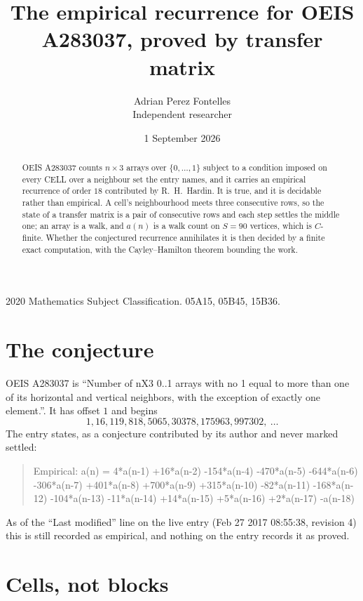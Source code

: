 \documentclass[11pt,a4paper]{article}
\title{The empirical recurrence for OEIS A283037, proved by transfer matrix}
\author{Adrian Perez Fontelles\\ \small Independent researcher}
\date{1 September 2026}
\theoremstyle{plain}
\theoremstyle{definition}
\begin{document}
\maketitle

\begin{abstract}
OEIS A283037 counts $n\times3$ arrays over $\{0,\dots,1\}$ subject to a condition imposed on
every CELL over a neighbour set the entry names, and it carries an empirical recurrence of
order $18$ contributed by R.~H.~Hardin. It is true, and it is decidable rather than
empirical. A cell's neighbourhood meets three consecutive rows, so the state of a transfer
matrix is a pair of consecutive rows and each step settles the middle one; an array is a
walk, and $a(n)$ is a walk count on $S=90$ vertices, which is $C$-finite. Whether the
conjectured recurrence annihilates it is then decided by a finite exact computation, with the
Cayley--Hamilton theorem bounding the work.
\end{abstract}

\noindent\small 2020 Mathematics Subject Classification. 05A15, 05B45, 15B36.\normalsize

\section{The conjecture}

OEIS A283037 is ``Number of nX3 0..1 arrays with no 1 equal to more than one of its horizontal and vertical neighbors, with the exception of exactly one element.''. It has offset $1$ and begins
\[
1, 16, 119, 818, 5065, 30378, 175963, 997302,\ \dots
\]
The entry states, as a conjecture contributed by its author and never marked settled:
\begin{quote}
Empirical: a(n) = 4*a(n-1) +16*a(n-2) -154*a(n-4) -470*a(n-5) -644*a(n-6) -306*a(n-7) +401*a(n-8) +700*a(n-9) +315*a(n-10) -82*a(n-11) -168*a(n-12) -104*a(n-13) -11*a(n-14) +14*a(n-15) +5*a(n-16) +2*a(n-17) -a(n-18)
\end{quote}
As of the ``Last modified'' line on the live entry (Feb 27 2017 08:55:38, revision 4) this is still
recorded as empirical, and nothing on the entry records it as proved.

\section{Cells, not blocks}
\end{document}
